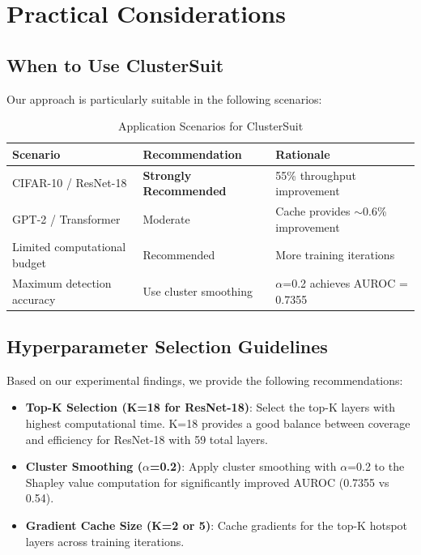 \documentclass[12pt,a4paper]{report}
\begin{document}
\section{Practical Considerations}
\label{sec:practical}

\subsection{When to Use ClusterSuit}
\label{sec:when_to_use}

Our approach is particularly suitable in the following scenarios:

\begin{table}[htbp]
    \centering
    \caption{Application Scenarios for ClusterSuit}
    \begin{tabular}{lll}
        \toprule
        \textbf{Scenario} & \textbf{Recommendation} & \textbf{Rationale} \\
        \midrule
        CIFAR-10 / ResNet-18 & \textbf{Strongly Recommended} & 55\% throughput improvement \\
        GPT-2 / Transformer & Moderate & Cache provides $\sim$0.6\% improvement \\
        Limited computational budget & Recommended & More training iterations \\
        Maximum detection accuracy & Use cluster smoothing & $\alpha$=0.2 achieves AUROC = 0.7355 \\
        \bottomrule
    \end{tabular}
    \label{tab:scenarios}
\end{table}

\subsection{Hyperparameter Selection Guidelines}
\label{sec:hyperparams}

Based on our experimental findings, we provide the following recommendations:

\begin{itemize}
    \item \textbf{Top-K Selection (K=18 for ResNet-18)}: Select the top-K layers with highest computational time. K=18 provides a good balance between coverage and efficiency for ResNet-18 with 59 total layers.
    
    \item \textbf{Cluster Smoothing ($\alpha$=0.2)}: Apply cluster smoothing with $\alpha$=0.2 to the Shapley value computation for significantly improved AUROC (0.7355 vs 0.54).
    
    \item \textbf{Gradient Cache Size (K=2 or 5)}: Cache gradients for the top-K hotspot layers across training iterations.
\end{itemize}
\end{document}
